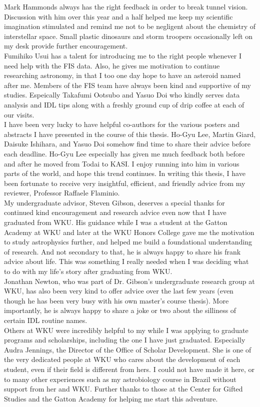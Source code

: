      Mark Hammonds always has the right feedback in order to break tunnel vision. Discussion with him over this year and a half helped me keep my scientific imagination stimulated and remind me not to be negligent about the chemistry of interstellar space. Small plastic dinosaurs and storm troopers occasionally left on my desk provide further encouragement. \\
     Fumihiko Usui has a talent for introducing me to the right people whenever I need help with the FIS data. Also, he gives me motivation to continue researching astronomy, in that I too one day hope to have an asteroid named after me.
     Members of the FIS team have always been kind and supportive of my studies. Espeically Takafumi Ootsubo and Yasuo Doi who kindly serves data analysis and IDL tips along with a freshly ground cup of drip coffee at each of our visits.\\
     I have been very lucky to have helpful co-authors for the various posters and abstracts I have presented in the course of this thesis. Ho-Gyu Lee, Martin Giard, Daisuke Ishihara, and Yasuo Doi somehow find time to share their advice before each deadline. Ho-Gyu Lee especially has given me much feedback both before and after he moved from Todai to KASI. I enjoy running into him in various parts of the world, and hope this trend continues. In writing this thesis, I have been fortunate to receive very insightful, efficient, and friendly advice from my reviewer, Professor Raffaele Flaminio.\\
     My undergraduate advisor, Steven Gibson, deserves a special thanks for continued kind encouragement and research advice even now that I have graduated from WKU. His guidance while I was a student at the Gatton Academy at WKU and later at the WKU Honors College gave me the motivation to study astrophysics further, and helped me build a foundational understanding of research. And not secondary to that, he is always happy to share his frank advice about life. This was something I really needed when I was deciding what to do with my life's story after graduating from WKU.\\ 
     Jonathan Newton, who was part of Dr. Gibson's undergraduate research group at WKU, has also been very kind to offer advice over the last few years (even though he has been very busy with his own master's course thesis). More importantly, he is always happy to share a joke or two about the silliness of certain IDL routine names.\\
     Others at WKU were incredibly helpful to my while I was applying to graduate programs and scholarships, including the one I have just graduated. Especially Audra Jennings, the Director of the Office of Scholar Development. She is one of the very dedicated people at WKU who cares about the development of each student, even if their field is different from hers. I could not have made it here, or to many other experiences such as my astrobiology course in Brazil without support from her and WKU. Further thanks to those at the Center for Gifted Studies and the Gatton Academy for helping me start this adventure. \\
